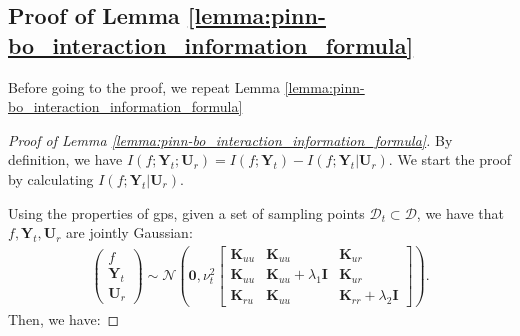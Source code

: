 \subsection{Proof of Lemma \ref{lemma:pinn-bo_interaction_information_formula}}
Before going to the proof, we repeat Lemma \ref{lemma:pinn-bo_interaction_information_formula}
\InteractionInformation*





\begin{proof}[Proof of Lemma \ref{lemma:pinn-bo_interaction_information_formula}]
By definition, we have $I (f; \mathbf{Y}_t; \mathbf{U}_r) = I(f; \mathbf{Y}_t) - I (f; \mathbf{Y}_t \rvert \mathbf{U}_r)$. We start the proof by calculating $I (f; \mathbf{Y}_t \rvert \mathbf{U}_r)$.

Using the properties of \acp{gp}, given a set of sampling points $\mathcal{D}_t\subset \mathcal{D}$, we have that $f, \mathbf{Y}_t, \mathbf{U}_r$ are jointly Gaussian:
\begin{align} 
\label{Eqn:joint_gauss_3_variables}
\begin{pmatrix}
    f \\
    \mathbf{Y}_t \\
    \mathbf{U}_r
\end{pmatrix} \sim \mathcal{N} \left(\mathbf{0}, \nu_t^2 \begin{bmatrix}
    \mathbf{K}_{uu} & \mathbf{K}_{uu} & \mathbf{K}_{ur} \\
    \mathbf{K}_{uu} & \mathbf{K}_{uu} + \lambda_1 \mathbf{I} & \mathbf{K}_{ur} \\
    \mathbf{K}_{ru} & \mathbf{K}_{uu} & \mathbf{K}_{rr} + \lambda_2 \mathbf{I}
\end{bmatrix} \right).   
\end{align} 
Then, we have:


\end{proof}
